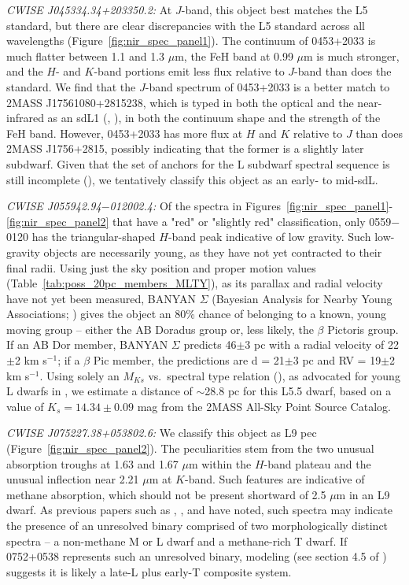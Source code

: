 \documentclass[twocolumn,tighten,twocolappendix]{aastex631}
\begin{document}
{\it CWISE J045334.34+203350.2:} At $J$-band, this object best matches the L5 standard, but there are clear discrepancies with the L5 standard across all wavelengths (Figure~\ref{fig:nir_spec_panel1}). The continuum of 0453+2033 is much flatter between 1.1 and 1.3 $\mu$m, the FeH band at 0.99 $\mu$m is much stronger, and the $H$- and $K$-band portions emit less flux relative to $J$-band than does the standard. We find that the $J$-band spectrum of 0453+2033 is a better match to 2MASS J17561080+2815238, which is typed in both the optical and the near-infrared as an sdL1 (\citealt{kirkpatrick2010}, \citealt{zhang2018}), in both the continuum shape and the strength of the FeH band. However, 0453+2033 has more flux at $H$ and $K$ relative to $J$ than does 2MASS J1756+2815, possibly indicating that the former is a slightly later subdwarf. Given that the set of anchors for the L subdwarf spectral sequence is still incomplete (\citealt{zhang2018}), we tentatively classify this object as an early- to mid-sdL.

{\it CWISE J055942.94$-$012002.4:} Of the spectra in Figures~\ref{fig:nir_spec_panel1}-\ref{fig:nir_spec_panel2} that have a "red" or "slightly red" classification, only 0559$-$0120 has the triangular-shaped $H$-band peak indicative of low gravity. Such low-gravity objects are necessarily young, as they have not yet contracted to their final radii. Using just the sky position and proper motion values (Table~\ref{tab:poss_20pc_members_MLTY}), as its parallax and radial velocity have not yet been measured, BANYAN $\Sigma$ (Bayesian Analysis for Nearby Young Associations; \citealt{gagne2018}) gives the object an 80\% chance of belonging to a known, young moving group -- either the AB Doradus group or, less likely, the $\beta$ Pictoris group. If an AB Dor member, BANYAN $\Sigma$ predicts 46$\pm$3 pc with a radial velocity of 22$\pm$2 km s$^{-1}$; if a $\beta$ Pic member, the predictions are d = 21$\pm$3 pc and RV = 19$\pm$2 km s$^{-1}$. Using solely an $M_{Ks}$ vs.\ spectral type relation (\citealt{dupuy2012}), as advocated for young L dwarfs in \cite{schneider2023}, we estimate a distance of $\sim$28.8 pc for this L5.5 dwarf, based on a value of $K_s = 14.34{\pm}0.09$ mag from the 2MASS All-Sky Point Source Catalog.

{\it CWISE J075227.38+053802.6:} We classify this object as L9 pec (Figure~\ref{fig:nir_spec_panel2}). The peculiarities stem from the two unusual absorption troughs at 1.63 and 1.67 $\mu$m within the $H$-band plateau and the unusual inflection near 2.21 $\mu$m at $K$-band. Such features are indicative of methane absorption, which should not be present shortward of 2.5 $\mu$m in an L9 dwarf. As previous papers such as \cite{burgasser2007b}, \cite{burgasser2010b}, and \cite{bardalez2014} have noted, such spectra may indicate the presence of an unresolved binary comprised of two morphologically distinct spectra -- a non-methane M or L dwarf and a methane-rich T dwarf. If 0752+0538 represents such an unresolved binary, modeling (see section 4.5 of \citealt{kirkpatrick2016}) suggests it is likely a late-L plus early-T composite system.
\end{document}
